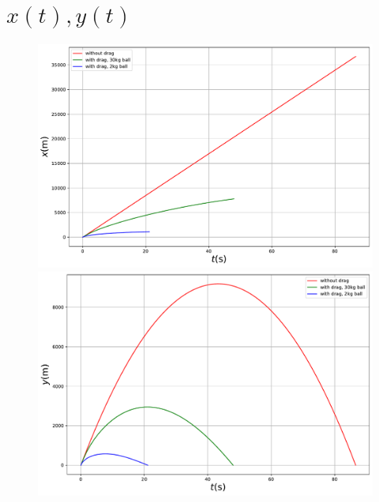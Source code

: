 \documentclass[a4paper,12pt]{article}
\begin{document}
	\section{$x(t), y(t)$}
	\begin{figure}
		\centering
		\includegraphics[width=\linewidth]{../figures/xplot}
		\includegraphics[width=\linewidth]{../figures/yplot}
	\end{figure}
	\newpage
\end{document}
